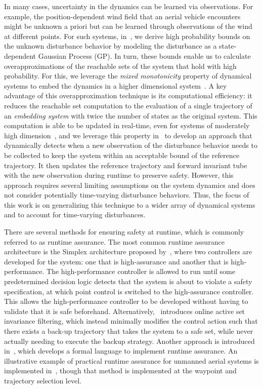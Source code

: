 \documentclass[preprint,12pt]{elsarticle}
\begin{document}
In many cases, uncertainty in the dynamics can be learned via observations. For example, the position-dependent wind field that an aerial vehicle encounters might be unknown a priori but can be learned through observations of the wind at different points. 
For such systems, in~\cite{caoMMGPs, caoMMGPOJCSYS}, we derive high probability bounds on the unknown disturbance behavior by modeling the disturbance as a state-dependent Gaussian Process (GP). In turn, these bounds enable us to calculate overapproximations of the reachable sets of the system that hold with high probability. For this, we leverage the \emph{mixed monotonicity} property of dynamical systems to embed the dynamics in a higher dimensional system~\cite{cooganMixMono, ENCISO2006205}. A key advantage of this overapproximation technique is its computational efficiency: it reduces the reachable set computation to the evaluation of a single trajectory of an \emph{embedding system} with twice the number of states as the original system. This computation is able to be updated in real-time, even for systems of moderately high dimension~\cite{abate2021hscc}, and we leverage this property in~\cite{caoICRARTA} to develop an approach that dynamically detects when a new observation of the disturbance behavior needs to be collected to keep the system within an acceptable bound of the reference trajectory. It then updates the reference trajectory and forward invariant tube with the new observation during runtime to preserve safety. However, this approach requires several limiting assumptions on the system dynamics and does not consider potentially time-varying disturbance behaviors. Thus, the focus of this work is on generalizing this technique to a wider array of dynamical systems and to account for time-varying disturbances.

There are several methods for ensuring safety at runtime, which is commonly referred to as runtime assurance. The most common runtime assurance architecture is the Simplex architecture proposed by~\cite{sha2001}, where two controllers are developed for the system: one that is high-assurance and another that is high-performance. The high-performance controller is allowed to run until some predetermined decision logic detects that the system is about to violate a safety specification, at which point control is switched to the high-assurance controller. This allows the high-performance controller to be developed without having to validate that it is safe beforehand. Alternatively,~\cite{gurriet2018} introduces online active set invariance filtering, which instead minimally modifies the control action such that there exists a back-up trajectory that takes the system to a safe set, while never actually needing to execute the backup strategy. Another approach is introduced in~\cite{lee1999runtime}, which develops a formal language to implement runtime assurance. An illustrative example of practical runtime assurance for unmanned aerial systems is implemented in~\cite{schierman2020runtime}, though that method is implemented at the waypoint and trajectory selection level.
\end{document}
